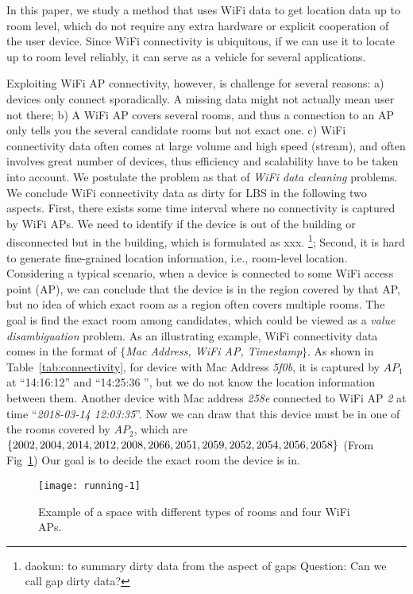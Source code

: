 In this paper, we study a method that uses WiFi data to get location data up to room level, which do not require any extra hardware or explicit cooperation of the user device. Since WiFi connectivity is ubiquitous, if we can use it to locate up to room level reliably, it can serve as a vehicle for several applications. 

Exploiting WiFi AP connectivity, however, is challenge for several reasons:
a) devices only connect sporadically. A missing data might not actually mean user not there; 
b) A WiFi AP covers several rooms, and thus a connection to an AP only tells you the several candidate rooms but not exact one. 
c) WiFi connectivity data often comes at large volume and high speed (stream), and often involves great number of devices, thus efficiency and scalability have to be taken into account. 
We postulate the problem as that of \textit{WiFi data cleaning} problems. 
We conclude WiFi connectivity data as dirty for LBS in the following two aspects. First,  there exists some time interval where no connectivity is captured by WiFi APs. We need to identify if the device is out of the building or disconnected but in the building, which is formulated as xxx. \footnote{daokun: to summary dirty data from the aspect of gaps Question: Can we call gap dirty data?}; Second, it is hard to generate fine-grained location information, i.e., room-level location. Considering a typical scenario, when a device is connected to some WiFi access point (AP), we can conclude that the device is in the region covered by that AP, but no idea of which exact room as a region often covers multiple rooms. The goal is find the exact room among candidates, which could be viewed as a \textit{value disambiguation} problem. 
As an illustrating example, WiFi connectivity data comes in the format of $\{$\textit{Mac Address, WiFi AP, Timestamp}$\}$. As shown in Table~\ref{tab:connectivity}, for device with Mac Address \textit{5f0b}, it is captured by $AP_{1}$ at ``14:16:12'' and ``14:25:36 '', but we do not know the location information between them. Another device with Mac address \textit{258e} connected to WiFi AP \textit{2} at time ``\textit{2018-03-14 12:03:35}''. Now we can draw that this device must be in one of the rooms covered by $AP_2$, which are  $\{2002,2004,2014,2012,2008,2066,2051,2059,2052,2054,\\2056,2058\}$ (From Fig~\ref{fig:running}) Our goal is to decide the exact room the device is in. 

\begin{figure}[!htb]
	\centering
	\vspace{-0.8em}
	\texttt{[image: running-1]}
	\caption{Example of a space with different types of rooms and four WiFi APs.}
	\label{fig:running}
\end{figure}

